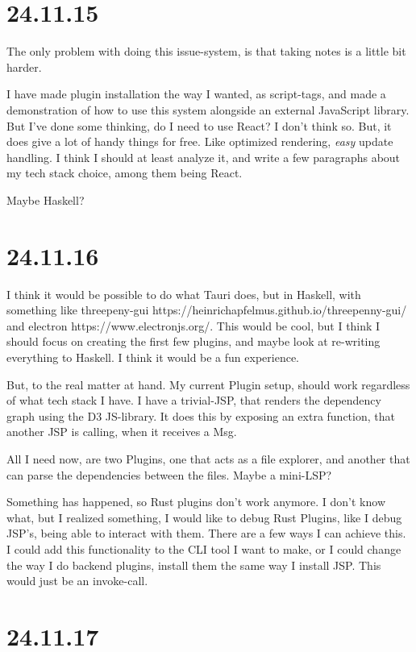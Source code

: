 \section{24.11.15}

The only problem with doing this issue-system, is that taking notes is a little
bit harder.

I have made plugin installation the way I wanted, as script-tags, and made a
demonstration of how to use this system alongside an external JavaScript
library. But I've done some thinking, do I need to use React? I don't think so.
But, it does give a lot of handy things for free. Like optimized rendering,
\textit{easy} update handling.
I think I should at least analyze it, and write a few paragraphs about my tech
stack choice, among them being React.

Maybe Haskell?


\section{24.11.16}

I think it would be possible to do what Tauri does, but in Haskell, with
something like threepeny-gui https://heinrichapfelmus.github.io/threepenny-gui/
and electron https://www.electronjs.org/. This would be cool, but I think I
should focus on creating the first few plugins, and maybe look at re-writing
everything to Haskell. I think it would be a fun experience.

But, to the real matter at hand. My current Plugin setup, should work
regardless of what tech stack I have. I have a trivial-JSP, that renders the
dependency graph using the D3 JS-library. It does this by exposing an extra
function, that another JSP is calling, when it receives a Msg.

All I need now, are two Plugins, one that acts as a file explorer, and another
that can parse the dependencies between the files. Maybe a mini-LSP?

Something has happened, so Rust plugins don't work anymore. I don't know what,
but I realized something, I would like to debug Rust Plugins, like I debug
JSP's, being able to interact with them. There are a few ways I can achieve
this. I could add this functionality to the CLI tool I want to make, or I
could change the way I do backend plugins, install them the same way I install
JSP. This would just be an invoke-call.


\section{24.11.17}


